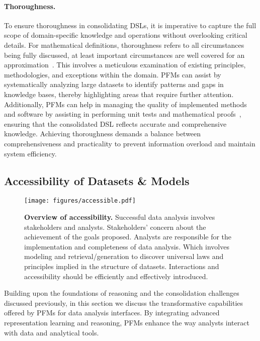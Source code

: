   \paragraph{Thoroughness.} To ensure thoroughness in consolidating DSLs, it is imperative to capture the full scope of domain-specific knowledge and operations without overlooking critical details. For mathematical definitions, thoroughness refers to all circumstances being fully discussed, at least important circumstances are well covered for an approximation~\cite{brand2023parameterized}. This involves a meticulous examination of existing principles, methodologies, and exceptions within the domain. PFMs can assist by systematically analyzing large datasets to identify patterns and gaps in knowledge bases, thereby highlighting areas that require further attention. Additionally, PFMs can help in managing the quality of implemented methods and software by assisting in performing unit tests and mathematical proofs~\cite{Wang2024TheoremLlamaTG, Carrott2024CoqPytPN}, ensuring that the consolidated DSL reflects accurate and comprehensive knowledge. Achieving thoroughness demands a balance between comprehensiveness and practicality to prevent information overload and maintain system efficiency.
  
  
  
  
  \subsection{Accessibility of Datasets \& Models}\label{sec:interpretability}
  
  \begin{figure*}[h]
    \centering
    \texttt{[image: figures/accessible.pdf]} %
    \caption{\textbf{Overview of accessibility.} Successful data analysis involves stakeholders and analysts. Stakeholders' concern about the achievement of the goals proposed. Analysts are responsible for the implementation and completeness of data analysis. Which involves modeling and retrieval/generation to discover universal laws and principles implied in the structure of datasets. Interactions and accessibility should be efficiently and effectively introduced.}
    \label{fig:accessible}
  \end{figure*}
  
  Building upon the foundations of reasoning and the consolidation challenges discussed previously, in this section we discuss the transformative capabilities offered by PFMs for data analysis interfaces. By integrating advanced representation learning and reasoning, PFMs enhance the way analysts interact with data and analytical tools. 
  
